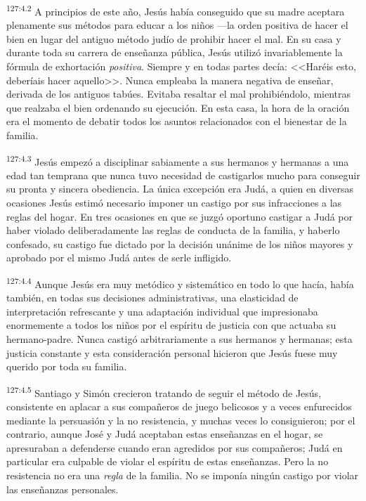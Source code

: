 \par 
\textsuperscript{127:4.2} A principios de este año, Jesús había conseguido que su madre aceptara plenamente sus métodos para educar a los niños ---la orden positiva de hacer el bien en lugar del antiguo método judío de prohibir hacer el mal. En su casa y durante toda su carrera de enseñanza pública, Jesús utilizó invariablemente la fórmula de exhortación \textit{positiva}. Siempre y en todas partes decía: <<Haréis esto, deberíais hacer aquello>>. Nunca empleaba la manera negativa de enseñar, derivada de los antiguos tabúes. Evitaba resaltar el mal prohibiéndolo, mientras que realzaba el bien ordenando su ejecución. En esta casa, la hora de la oración era el momento de debatir todos los asuntos relacionados con el bienestar de la familia.

\par 
\textsuperscript{127:4.3} Jesús empezó a disciplinar sabiamente a sus hermanos y hermanas a una edad tan temprana que nunca tuvo necesidad de castigarlos mucho para conseguir su pronta y sincera obediencia. La única excepción era Judá, a quien en diversas ocasiones Jesús estimó necesario imponer un castigo por sus infracciones a las reglas del hogar. En tres ocasiones en que se juzgó oportuno castigar a Judá por haber violado deliberadamente las reglas de conducta de la familia, y haberlo confesado, su castigo fue dictado por la decisión unánime de los niños mayores y aprobado por el mismo Judá antes de serle infligido.

\par 
\textsuperscript{127:4.4} Aunque Jesús era muy metódico y sistemático en todo lo que hacía, había también, en todas sus decisiones administrativas, una elasticidad de interpretación refrescante y una adaptación individual que impresionaba enormemente a todos los niños por el espíritu de justicia con que actuaba su hermano-padre. Nunca castigó arbitrariamente a sus hermanos y hermanas; esta justicia constante y esta consideración personal hicieron que Jesús fuese muy querido por toda su familia.

\par 
\textsuperscript{127:4.5} Santiago y Simón crecieron tratando de seguir el método de Jesús, consistente en aplacar a sus compañeros de juego belicosos y a veces enfurecidos mediante la persuasión y la no resistencia, y muchas veces lo consiguieron; por el contrario, aunque José y Judá aceptaban estas enseñanzas en el hogar, se apresuraban a defenderse cuando eran agredidos por sus compañeros; Judá en particular era culpable de violar el espíritu de estas enseñanzas. Pero la no resistencia no era una \textit{regla} de la familia. No se imponía ningún castigo por violar las enseñanzas personales.

